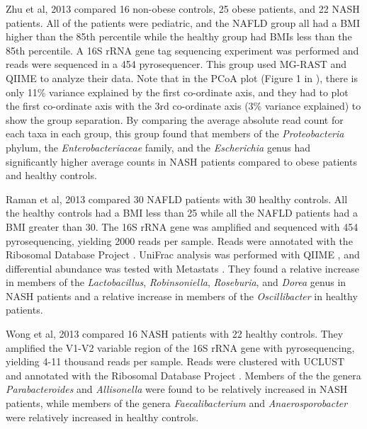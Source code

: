 Zhu et al, 2013 \cite{zhu2013characterization} compared 16 non-obese controls, 25 obese patients, and 22 NASH patients. All of the patients were pediatric, and the NAFLD group all had a BMI higher than the 85th percentile while the healthy group had BMIs less than the 85th percentile. A 16S rRNA gene tag sequencing experiment was performed and reads were sequenced in a 454 pyrosequencer. This group used MG-RAST \cite{meyer2008metagenomics} and QIIME \cite{caporaso2010qiime} to analyze their data. Note that in the PCoA plot (Figure 1 in \cite{zhu2013characterization}), there is only 11\% variance explained by the first co-ordinate axis, and they had to plot the first co-ordinate axis with the 3rd co-ordinate axis (3\% variance explained) to show the group separation. By comparing the average absolute read count for each taxa in each group, this group found that members of the \textit{Proteobacteria} phylum, the \textit{Enterobacteriaceae} family, and the \textit{Escherichia} genus had significantly higher average counts in NASH patients compared to obese patients and healthy controls.

Raman et al, 2013 \cite{raman2013fecal} compared 30 NAFLD patients with 30 healthy controls. All the healthy controls had a BMI less than 25 while all the NAFLD patients had a BMI greater than 30. The 16S rRNA gene was amplified and sequenced with 454 pyrosequencing, yielding 2000 reads per sample. Reads were annotated with the Ribosomal Database Project \cite{cole2009ribosomal}. UniFrac analysis was performed with QIIME \cite{caporaso2010qiime}, and differential abundance was tested with Metastats \cite{paulson2011metastats}. They found a relative increase in members of the \textit{Lactobacillus}, \textit{Robinsoniella}, \textit{Roseburia}, and \textit{Dorea} genus in NASH patients and a relative increase in members of the \textit{Oscillibacter} in healthy patients.

Wong et al, 2013 \cite{wong2013molecular} compared 16 NASH patients with 22 healthy controls. They amplified the V1-V2 variable region of the 16S rRNA gene with pyrosequencing, yielding 4-11 thousand reads per sample. Reads were clustered with UCLUST \cite{edgar2010search} and annotated with the Ribosomal Database Project \cite{cole2009ribosomal}. Members of the the genera \textit{Parabacteroides} and \textit{Allisonella} were found to be relatively increased in NASH patients, while members of the genera \textit{Faecalibacterium} and \textit{Anaerosporobacter} were relatively increased in healthy controls.

